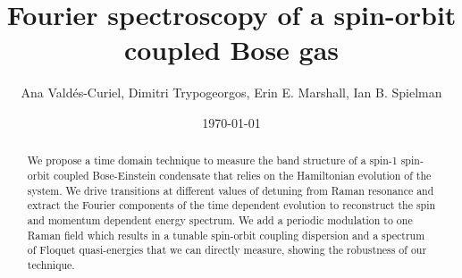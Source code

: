 \documentclass[12pt]{iopart}
\begin{document}
		
\title{Fourier spectroscopy of a spin-orbit coupled Bose gas}
	
\author{Ana Vald\'es-Curiel, Dimitri Trypogeorgos, Erin E. Marshall, Ian B. Spielman}
\address{Joint Quantum Institute, University of Maryland and National Institute of Standards and Technology, College Park, Maryland, 20742, USA}
\date{\today}

\begin{abstract}
	
	 We propose a time domain technique to measure the band structure of a spin-1 spin-orbit coupled Bose-Einstein condensate that relies on the Hamiltonian evolution of the system. We drive transitions at different values of detuning from Raman resonance and extract the Fourier components of the time dependent evolution to reconstruct the spin and momentum dependent energy spectrum. We add a periodic modulation to one Raman field which results in a tunable spin-orbit coupling dispersion and a spectrum of Floquet quasi-energies that we can directly measure, showing the robustness of our technique.  
\end{abstract}

\maketitle









%



%

 
\end{document}
